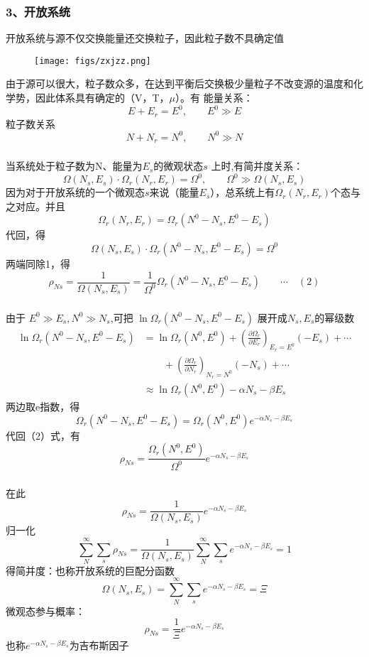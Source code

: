 \begin{frame}
  \frametitle{ 3、开放系统}
  开放系统与源不仅交换能量还交换粒子，因此粒子数不具确定值
  \begin{figure}[htbp]
    \centering
    \texttt{[image: figs/zxjzz.png]}
  \end{figure}
  由于源可以很大，粒子数众多，在达到平衡后交换极少量粒子不改变源的温度和化学势，因此体系具有确定的（V，T，$\mu$）。有
  能量关系：
  \[ E + E_r = E^0, \qquad E^0 \gg E\] 
  粒子数关系
  \[ N + N_r = N^0, \qquad N^0 \gg N\]  
\end{frame} 

\begin{frame}
  \frametitle{}
  当系统处于粒子数为N、能量为$E_s$的微观状态$s$ 上时,有简并度关系：
  \[ \Omega(N_s, E_s) \cdot \Omega _r(N_r, E_r) = \Omega ^0, \qquad \Omega ^0 \gg \Omega(N_s, E_s)\]
  因为对于开放系统的一个微观态$s$来说（能量$E_s$），总系统上有$\Omega _r (N_r,E_r)$个态与之对应。并且
  \[\Omega _r (N_r, E_r) = \Omega _r(N^0 - N_s , E^0 - E_s) \] 
  代回，得 
  \[ \Omega(N_s, E_s) \cdot \Omega _r(N^0 - N_s , E^0 - E_s) = \Omega ^0\]
  两端同除1，得
  \[ \rho _{Ns} = \frac{1}{\Omega(N_s, E_s)} = \frac{1}{\Omega ^0}\Omega _r(N^0 - N_s , E^0 - E_s) \qquad \cdots  \quad (2)\]
\end{frame} 

\begin{frame}
  \frametitle{}
由于 $ E^0 \gg E_s, N^0 \gg N_s $,可把  $ \ln \Omega _r(N^0 - N_s , E^0 - E_s)  $ 展开成$N_s, E_s$的幂级数
\[ 
\begin{aligned}
  \ln \Omega _r(N^0 - N_s , E^0 - E_s)  &=  \ln \Omega _r (N^0 , E^0) + \left(\frac{\partial \Omega _r }{\partial E_r}\right)_{E_r =E^0} (-E_s) +\cdots \\ 
  & \qquad + \left(\frac{\partial \Omega _r }{\partial N_r}\right)_{N_r =N^0} (-N_s) +\cdots \\ 
  & \approx \ln \Omega _r (N^0 , E^0) - \alpha  N_s - \beta  E_s 
\end{aligned}  
\] 
两边取e指数，得
\[ \Omega _r(N^0 - N_s , E^0 - E_s) = \Omega _r (N^0 , E^0) e^{- \alpha  N_s - \beta E_s }\]
代回（2）式，有
\[\rho _{Ns}  =  \frac{\Omega _r (N^0 , E^0)}{\Omega^0 } e^{- \alpha  N_s - \beta E_s }\]
\end{frame} 

\begin{frame}
  \frametitle{}
在此
\[\rho  _{Ns}  =  \frac{1}{\Omega(N_s, E_s) } e^{- \alpha  N_s - \beta E_s }\] 
归一化
\[\sum_N^{\infty}\sum_s  \rho  _{Ns} = \frac{1}{\Omega(N_s, E_s) }  \sum_N^{\infty} \sum_s   e^{- \alpha  N_s - \beta E_s } =1 \]
得简并度：也称开放系统的巨配分函数
\[\Omega(N_s, E_s) = \sum_N^{\infty} \sum_s  e^{- \alpha  N_s - \beta E_s } = \Xi \]
微观态参与概率：
\[\rho  _{Ns}  =  \frac{1}{\Xi} e^{- \alpha  N_s - \beta E_s }\] 
也称$ e^{- \alpha  N_s - \beta E_s }$为吉布斯因子 
\end{frame} 

